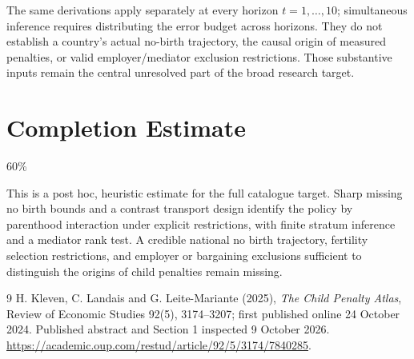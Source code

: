 \documentclass[11pt]{article}
\theoremstyle{remark}\newtheorem{remark}[theorem]{Remark}
\begin{document}
The same derivations apply separately at every horizon $t=1,\ldots,10$; simultaneous inference requires distributing the error budget across horizons. They do not establish a country's actual no-birth trajectory, the causal origin of measured penalties, or valid employer/mediator exclusion restrictions. Those substantive inputs remain the central unresolved part of the broad research target.

\section{Completion Estimate}
60\%

This is a post hoc, heuristic estimate for the full catalogue target.
Sharp missing no birth bounds and a contrast transport design identify the policy by parenthood interaction under explicit restrictions, with finite stratum inference and a mediator rank test. A credible national no birth trajectory, fertility selection restrictions, and employer or bargaining exclusions sufficient to distinguish the origins of child penalties remain missing.

\begin{thebibliography}{9}
 H. Kleven, C. Landais and G. Leite-Mariante (2025), \emph{The Child Penalty Atlas}, Review of Economic Studies 92(5), 3174--3207; first published online 24 October 2024. Published abstract and Section 1 inspected 9 October 2026. \url{https://academic.oup.com/restud/article/92/5/3174/7840285}.
\end{thebibliography}
\end{document}
